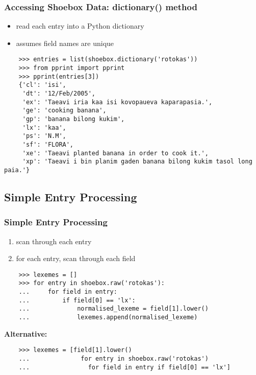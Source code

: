 \documentclass{beamer}
\begin{document}
\begin{frame}[fragile]
\frametitle{Accessing Shoebox Data: dictionary() method}

\begin{itemize}
\item read each entry into a Python dictionary
\item assumes field names are unique
\end{itemize}

\begin{verbatim}
    >>> entries = list(shoebox.dictionary('rotokas'))
    >>> from pprint import pprint
    >>> pprint(entries[3])
    {'cl': 'isi',
     'dt': '12/Feb/2005',
     'ex': 'Taeavi iria kaa isi kovopaueva kaparapasia.',
     'ge': 'cooking banana',
     'gp': 'banana bilong kukim',
     'lx': 'kaa',
     'ps': 'N.M',
     'sf': 'FLORA',
     'xe': 'Taeavi planted banana in order to cook it.',
     'xp': 'Taeavi i bin planim gaden banana bilong kukim tasol long paia.'}
\end{verbatim}
\end{frame}

\subsection{Simple Entry Processing}

\begin{frame}[fragile]
\frametitle{Simple Entry Processing}
\begin{enumerate}
\item scan through each entry
\item for each entry, scan through each field
\end{enumerate}

\begin{verbatim}
    >>> lexemes = []
    >>> for entry in shoebox.raw('rotokas'):
    ...     for field in entry:
    ...         if field[0] == 'lx':
    ...             normalised_lexeme = field[1].lower()
    ...             lexemes.append(normalised_lexeme)
\end{verbatim}

\textbf{Alternative:}

\begin{verbatim}
    >>> lexemes = [field[1].lower()
    ...              for entry in shoebox.raw('rotokas')
    ...	               for field in entry if field[0] == 'lx']
\end{verbatim}
\end{frame}
\end{document}
